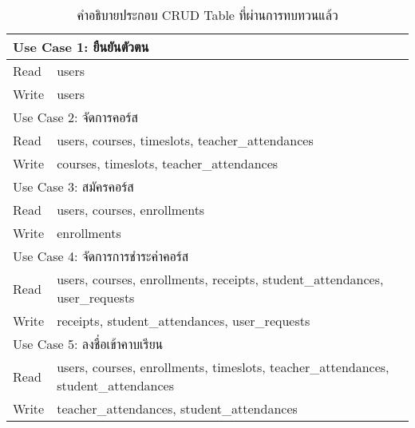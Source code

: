 \begin{table}[H]
\caption{คำอธิบายประกอบ CRUD Table ที่ผ่านการทบทวนแล้ว}
\label{tab:crud-description-final}
\begin{tabularx}{\textwidth}{|ll|}
\hline
\multicolumn{2}{|l|}{Use Case 1: ยืนยันตัวตน}                                                                    \\ \hline
\multicolumn{1}{|l|}{Read}  & users                                                                              \\ \hline
\multicolumn{1}{|l|}{Write} & users                                                                              \\ \hline
\multicolumn{2}{|l|}{Use Case 2: จัดการคอร์ส}                                                                    \\ \hline
\multicolumn{1}{|l|}{Read}  & users, courses, timeslots, teacher\_attendances                                    \\ \hline
\multicolumn{1}{|l|}{Write} & courses, timeslots, teacher\_attendances                                           \\ \hline
\multicolumn{2}{|l|}{Use Case 3: สมัครคอร์ส}                                                                     \\ \hline
\multicolumn{1}{|l|}{Read}  & users, courses, enrollments                                                        \\ \hline
\multicolumn{1}{|l|}{Write} & enrollments                                                                        \\ \hline
\multicolumn{2}{|l|}{Use Case 4: จัดการการชำระค่าคอร์ส}                                                          \\ \hline
\multicolumn{1}{|l|}{Read}  & users, courses, enrollments, receipts, student\_attendances, user\_requests        \\ \hline
\multicolumn{1}{|l|}{Write} & receipts, student\_attendances, user\_requests                                     \\ \hline
\multicolumn{2}{|l|}{Use Case 5: ลงชื่อเข้าคาบเรียน}                                                             \\ \hline
\multicolumn{1}{|l|}{Read}  & users, courses, enrollments, timeslots, teacher\_attendances, student\_attendances \\ \hline
\multicolumn{1}{|l|}{Write} & teacher\_attendances, student\_attendances                                         \\ \hline

\end{tabularx}
\end{table}
